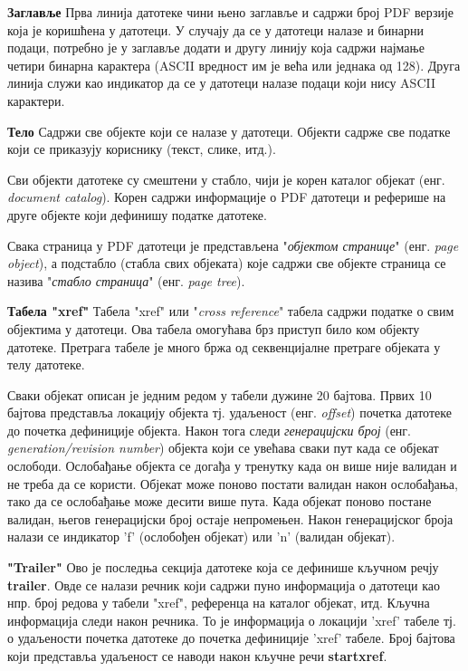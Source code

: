 \documentclass[12pt,oneside]{memoir}
\begin{document}
\begin{description}
\item \textbf{Заглавље} Прва линија датотеке чини њено заглавље и садржи број PDF верзије која је коришћена у датотеци. У случају да се у датотеци налазе и бинарни подаци, потребно је у заглавље додати и другу линију која садржи најмање четири бинарна карактера (ASCII вредност им је већа или једнака од 128). Друга линија служи као индикатор да се у датотеци налазе подаци који нису ASCII карактери.
\item \textbf{Тело} Садржи све објекте који се налазе у датотеци. Објекти садрже све податке који се приказују кориснику (текст, слике, итд.).

Сви објекти датотеке су смештени у стабло, чији је корен каталог објекат (енг. \textit{document catalog}). Корен садржи информације о PDF датотеци и реферише на друге објекте који дефинишу податке датотеке. 

Свака страница у PDF датотеци је представљена "\textit{објектом странице}" (енг. \textit{page object}), а подстабло (стабла свих објеката) које садржи све објекте страница се назива "\textit{стабло страница}" (енг. \textit{page tree}). 
\item \textbf{Табела "xref"} Табела "xref" или "\textit{cross reference}" табела садржи податке о свим објектима у датотеци. Ова табела омогућава брз приступ било ком објекту датотеке. Претрага табеле је много бржа од секвенцијалне претраге објеката у телу датотеке.

Сваки објекат описан је једним редом у табели дужине 20 бајтова. Првих 10 бајтова представља локацију објекта тј. удаљеност (енг. \textit{offset}) почетка датотеке до почетка дефиниције објекта. Након тога следи \textit{генерацијски број} (енг. \textit{generation/revision number}) објекта који се увећава сваки пут када се објекат ослободи. Ослобађање објекта се догађа у тренутку када он више није валидан и не треба да се користи. Објекат може поново постати валидан након ослобађања, тако да се ослобађање може десити више пута. Када објекат поново постане валидан, његов генерацијски број остаје непромењен. Након генерацијског броја налази се индикатор 'f' (ослобођен објекат) или 'n' (валидан објекат). 
\item \textbf{"Trailer"} Ово је последња секција датотеке која се дефинише кључном речју \textbf{trailer}. Овде се налази речник који садржи пуно информација о датотеци као нпр. број редова у табели "xref", референца на каталог објекат, итд. Кључна информација следи након речника. То је информација о локацији 'xref' табеле тј. о удаљености почетка датотеке до почетка дефиниције 'xref' табеле. Број бајтова који представља удаљеност се наводи након кључне речи \textbf{startxref}.
\end{description}
\end{document}
